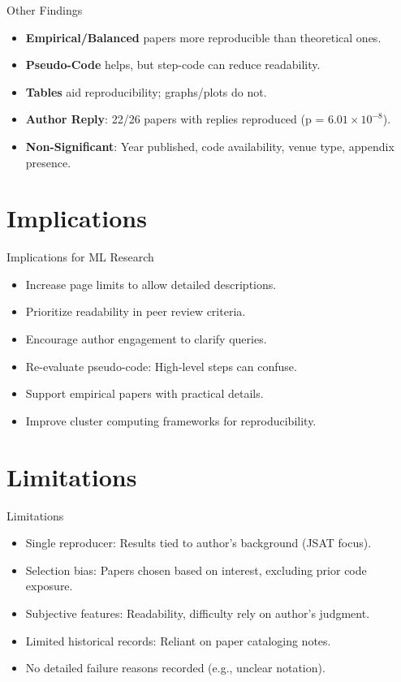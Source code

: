 \documentclass[10pt]{beamer}
\begin{document}
\begin{frame}{Other Findings}
    \begin{itemize}
        \item \textbf{Empirical/Balanced} papers more reproducible than theoretical ones.
        \item \textbf{Pseudo-Code} helps, but step-code can reduce readability.
        \item \textbf{Tables} aid reproducibility; graphs/plots do not.
        \item \textbf{Author Reply}: 22/26 papers with replies reproduced (p = $6.01 \times 10^{-8}$).
        \item \textbf{Non-Significant}: Year published, code availability, venue type, appendix presence.
    \end{itemize}
\end{frame}

\section{Implications}

\begin{frame}{Implications for ML Research}
    \begin{itemize}
        \item Increase page limits to allow detailed descriptions.
        \item Prioritize readability in peer review criteria.
        \item Encourage author engagement to clarify queries.
        \item Re-evaluate pseudo-code: High-level steps can confuse.
        \item Support empirical papers with practical details.
        \item Improve cluster computing frameworks for reproducibility.
    \end{itemize}
\end{frame}

\section{Limitations}

\begin{frame}{Limitations}
    \begin{itemize}
        \item Single reproducer: Results tied to author’s background (JSAT focus).
        \item Selection bias: Papers chosen based on interest, excluding prior code exposure.
        \item Subjective features: Readability, difficulty rely on author’s judgment.
        \item Limited historical records: Reliant on paper cataloging notes.
        \item No detailed failure reasons recorded (e.g., unclear notation).
    \end{itemize}
\end{frame}
\end{document}
